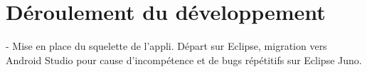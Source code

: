 \section{Déroulement du développement}
- Mise en place du squelette de l'appli. Départ sur Eclipse, migration vers Android Studio pour cause d'incompétence et de bugs répétitifs sur Eclipse Juno.